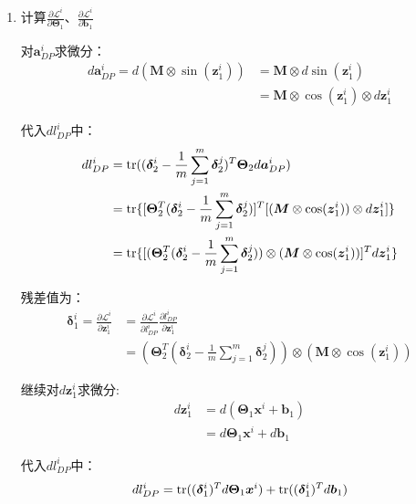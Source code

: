 \documentclass[12pt, a4paper]{article}
\newcommand{\imat}{\bm}
\newcommand{\ivec}{\bm}
\newcommand{\tr}{{\rm tr}}
\newcommand{\loss}{\mathcal{L}}
\newcommand{\thetam}{\imat{\Theta}}
\newcommand{\deltav}{\ivec{\delta}}
\newcommand{\av}{\ivec{a}}
\newcommand{\bv}{\ivec{b}}
\newcommand{\xv}{\ivec{x}}
\newcommand{\zv}{\ivec{z}}
\begin{document}
\begin{enumerate}
        \item 计算$\frac{\partial \loss^i}{\partial \thetam_1}$、$\frac{\partial \loss^i}{\partial \bv_1}$

            对$\av_{DP}^i$求微分：
            \begin{align*}
            d \av_{DP}^i = d (\ivec{M} \otimes \sin(\zv_1^i))
            &= \ivec{M} \otimes d \sin(\zv_1^i) \\
            &= \ivec{M} \otimes \cos(\zv_1^i) \otimes d \zv_1^i
            \end{align*}

            代入$d l_{DP}^i$中：
            \begin{align*}
            d l_{DP}^i
            &= \tr((\deltav_2^i - \frac{1}{m} \sum_{j = 1}^{m} \deltav_2^j)^T \thetam_2 d \av_{DP}^i) \\
            &= \tr\{[\thetam_2^T (\deltav_2^i - \frac{1}{m} \sum_{j = 1}^{m} \deltav_2^j)]^T [(\ivec{M} \otimes \cos(\zv_1^i)) \otimes d \zv_1^i]\} \\
            &= \tr\{[(\thetam_2^T (\deltav_2^i - \frac{1}{m} \sum_{j = 1}^{m} \deltav_2^j)) \otimes (\ivec{M} \otimes \cos(\zv_1^i))]^T d \zv_1^i\} \\
            \end{align*}

            残差值为：
            \begin{equation}\begin{aligned}
            \deltav_1^i = \frac{\partial \loss^i}{\partial \zv_1^i}
            &= \frac{\partial \loss^i}{\partial l_{DP}^i} \frac{\partial l_{DP}^i}{\partial \zv_1^i} \\
            &= (\thetam_2^T (\deltav_2^i - \frac{1}{m} \sum_{j = 1}^{m} \deltav_2^j)) \otimes (\ivec{M} \otimes \cos(\zv_1^i))
            \end{aligned}\end{equation}

            继续对$d \zv_1^i$求微分:
            \begin{align*}
            d \zv_1^i
            &= d (\thetam_1 \xv^i + \bv_1) \\
            &= d \thetam_1 \xv^i + d \bv_1
            \end{align*}

            代入$d l_{DP}^i$中：
            \begin{align*}
            d l_{DP}^i = \tr((\deltav_1^i)^T d \thetam_1 \xv^i) + \tr((\deltav_1^i)^T d \bv_1)
            \end{align*}


\end{enumerate}
\end{document}
